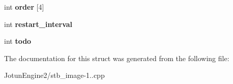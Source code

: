 \begin{DoxyCompactItemize}
\item 
\hypertarget{structjpeg_ac0f5240fc472e75239328f51a50f45b6}{int {\bfseries order} \mbox{[}4\mbox{]}}\label{structjpeg_ac0f5240fc472e75239328f51a50f45b6}

\item 
\hypertarget{structjpeg_ab13af34259b1f1c6cf8f35411a77e39e}{int {\bfseries restart\-\_\-interval}}\label{structjpeg_ab13af34259b1f1c6cf8f35411a77e39e}

\item 
\hypertarget{structjpeg_a6b4a8a352872847d84ea5ef1a4bc245e}{int {\bfseries todo}}\label{structjpeg_a6b4a8a352872847d84ea5ef1a4bc245e}

\end{DoxyCompactItemize}


The documentation for this struct was generated from the following file\-:\begin{DoxyCompactItemize}
\item 
Jotun\-Engine2/stb\-\_\-image-\/1..\-cpp\end{DoxyCompactItemize}
